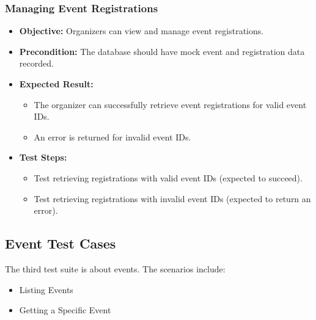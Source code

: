 \subsubsection{Managing Event Registrations}
\begin{itemize}
    \item \textbf{Objective:} Organizers can view and manage event registrations.
    \item \textbf{Precondition:} The database should have mock event and registration data recorded.
    \item \textbf{Expected Result:}
    \begin{itemize}
        \item The organizer can successfully retrieve event registrations for valid event IDs.
        \item An error is returned for invalid event IDs.
    \end{itemize}
    \item \textbf{Test Steps:}
    \begin{itemize}
        \item Test retrieving registrations with valid event IDs (expected to succeed).
        \item Test retrieving registrations with invalid event IDs (expected to return an error).
    \end{itemize}
\end{itemize}


\subsection{Event Test Cases}
The third test suite is about events. The scenarios include:
\begin{itemize}
    \item Listing Events
    \item Getting a Specific Event
\end{itemize}

\vspace{1cm}

